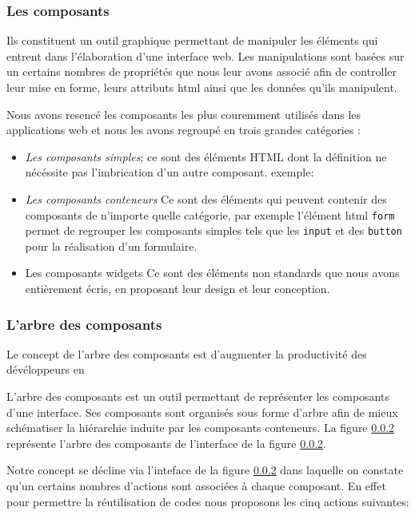 \documentclass[a4paper,12pt]{article}
\begin{document}
\subsubsection{ Les composants} %
Ils constituent un outil graphique permettant de manipuler les
éléments qui entrent dans l'élaboration d'une interface web. Les
manipulations sont basées sur un certains nombres de propriétés que 
nous leur avons associé afin de controller leur mise en forme, leurs
attributs html ainsi que les données qu'ils manipulent.

Nous avons resencé les composants les plus couremment utilisés dans les
applications web et nous les avons regroupé en trois grandes
catégories :

\begin{itemize}
\item {\em Les composants simples};
ce sont des éléments HTML dont la définition ne nécéssite pas
l'imbrication d'un autre composant.
exemple:
\item  {\em Les composants conteneurs} 
Ce sont des éléments qui peuvent contenir des composants de
n'importe quelle catégorie, par exemple l'élément html {\tt form}
permet de regrouper les composants simples tels que les {\tt input} et
des {\tt button} pour la réalisation d'un formulaire.
\item Les composants widgets
Ce sont des éléments non standards que nous avons entièrement écris, en
proposant leur design et leur conception.
\end{itemize}



\subsubsection{ L'arbre des composants} 
Le concept de l'arbre des composants est d'augmenter la productivité
des dévéloppeurs en %


L'arbre des composants est un outil permettant de représenter les
composants d'une interface. Ses composants sont organisés sous forme
d'arbre afin de mieux schématiser la hiérarchie induite par les
composants conteneurs. La figure \ref{} représente l'arbre des
composants de l'interface de la figure \ref{}.

Notre concept se décline via l'inteface de la figure \ref{} dans
laquelle on constate qu'un certains nombres d'actions sont associées à
chaque composant. En effet pour permettre la réutilisation de codes
nous proposons les cinq actions suivantes:
\end{document}
